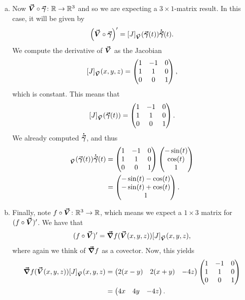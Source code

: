 \documentclass[12pt]{article} %
\begin{document}
\begin{solution}
\begin{enumerate}[(a)]
        \item Now $\boldsymbol{\vec{V}} \circ \boldsymbol{\vec{\gamma}} \colon \mathbb{R} \to \mathbb{R}^3$ and so we are expecting a $3\times 1$-matrix result.  In this case, it will be given by
        \[
        \left( \boldsymbol{\vec{V}} \circ \boldsymbol{\vec{\gamma}}\right)' = [J]_{\boldsymbol{\vec{V}}}(\boldsymbol{\vec{\gamma}}(t))\boldsymbol{\dot{\vec{\gamma}}}(t).
        \]
        We compute the derivative of $\boldsymbol{\vec{V}}$ as the Jacobian
        \[
        [J]_{\boldsymbol{\vec{V}}}(x,y,z) = \begin{pmatrix} 1 & -1 & 0 \\ 1 & 1 & 0 \\ 0 & 0 & 1 \end{pmatrix},
        \]
        which is constant. This means that
        \[
        [J]_{\boldsymbol{\vec{V}}}(\boldsymbol{\vec{\gamma}}(t)) = \begin{pmatrix} 1 & -1 & 0 \\ 1 & 1 & 0 \\ 0 & 0 & 1 \end{pmatrix}.
        \]
        We already computed $\boldsymbol{\dot{\vec{\gamma}}}$, and thus
        \begin{align*}
        [J]_{\vecfieldV}(\curvegamma(t))\tangentgamma(t) &= \begin{pmatrix} 1 & -1 & 0 \\ 1 & 1 & 0 \\ 0 & 0 & 1 \end{pmatrix}\begin{pmatrix} -\sin(t) \\ \cos(t) \\ 1 \end{pmatrix} \\
        &= \begin{pmatrix} -\sin(t)-\cos(t) \\ -\sin(t) +\cos(t) \\ 1 \end{pmatrix}.
        \end{align*}
        
        \item Finally, note $f\circ \boldsymbol{\vec{V}} \colon \mathbb{R}^3 \to \mathbb{R}$, which means we expect a $1\times 3$ matrix for $(f\circ \boldsymbol{\vec{V}})'$.  We have that
        \[
        (f\circ \boldsymbol{\vec{V}})' = \boldsymbol{\vec{\nabla}} f(\boldsymbol{\vec{V}}(x,y,z)) [J]_{\boldsymbol{\vec{V}}}(x,y,z),
        \]
        where again we think of $\boldsymbol{\vec{\nabla}} f$ as a covector.  Now, this yields
        \begin{align*}
        \boldsymbol{\vec{\nabla}} f(\boldsymbol{\vec{V}}(x,y,z)) [J]_{\boldsymbol{\vec{V}}}(x,y,z) &= \begin{pmatrix} 2(x-y) & 2(x+y) & -4z \end{pmatrix} \begin{pmatrix} 1 & -1 & 0 \\ 1 & 1 & 0 \\ 0 & 0 & 1 \end{pmatrix}\\
        &= \begin{pmatrix} 4x & 4y & -4z \end{pmatrix}.
        \end{align*}
    \end{enumerate}
    
\end{solution}
\end{document}
